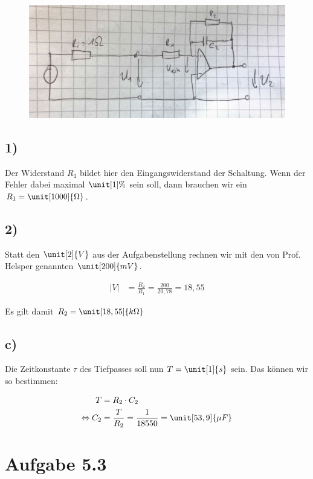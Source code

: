 \begin{figure}[h]
	\centering
	\includegraphics[scale=0.1]{A5_2_1.jpg}
\end{figure}


\subsection*{1)}

Der Widerstand $R_1$ bildet hier den Eingangswiderstand der Schaltung. Wenn der Fehler dabei maximal $\unit[1]{\%}$ sein soll, dann brauchen wir ein $R_1 = \unit[1000]{\Omega}$.

\subsection*{2)}

Statt den $\unit[2]{V}$ aus der Aufgabenstellung rechnen wir mit den von Prof. Helsper genannten $\unit[200]{mV}$.

\begin{align*}
|V| &= \frac{R_2}{R_1} = \frac{200}{20,78} = 18,55
\end{align*}

Es gilt damit $R_2 = \unit[18,55]{k \Omega}$

\subsection*{c)}

Die Zeitkonstante $\tau$ des Tiefpasses soll nun $T = \unit[1]{s}$ sein. Das können wir so bestimmen:

\begin{align*}
T &= R_2 \cdot C_2 \\
\Leftrightarrow C_2 &= \frac{T}{R_2} = \frac{1}{18550} = \unit[53,9]{\mu F}
\end{align*}


\section{Aufgabe 5.3}


